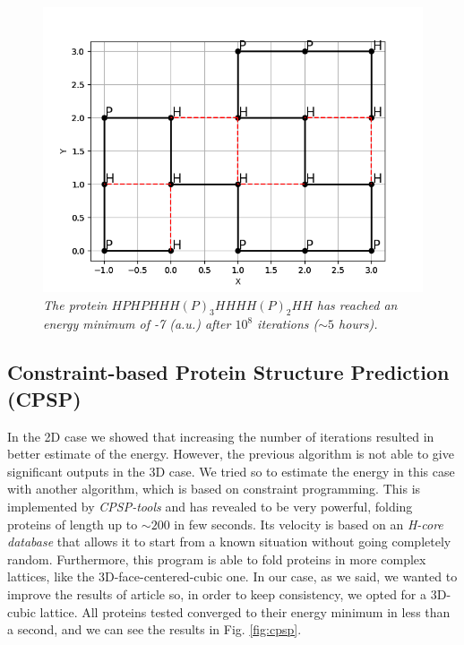 \begin{figure}[H]
    \centering
    \includegraphics[width=.6\textwidth]{./img/18_2.png}
    \caption{\emph{The protein $HPHPHHH(P)_3HHHH(P)_2HH$ has reached an energy minimum of -7 (a.u.) after $10^8$ iterations ($\sim 5$ hours).}}
    \label{fig:18_2}
\end{figure}

\subsection{Constraint-based Protein Structure Prediction (CPSP)}
In the 2D case we showed that increasing the number of iterations resulted in better estimate of the energy.
However, the previous algorithm is not able to give significant outputs in the 3D case.
We tried so to estimate the energy in this case with another algorithm, which is based on constraint programming.
This is implemented by \emph{CPSP-tools} \cite{cpsp} and has revealed to be very powerful, folding proteins of length up to $\sim 200$ in few seconds.
Its velocity is based on an \emph{H-core database} that allows it to start from a known situation without going completely random.
Furthermore, this program is able to fold proteins in more complex lattices, like the 3D-face-centered-cubic one.
In our case, as we said, we wanted to improve the results of article \cite{PERM} so, in order to keep consistency, we opted for a 3D-cubic lattice.
All proteins tested converged to their energy minimum in less than a second, and we can see the results in Fig. \ref{fig:cpsp}.

